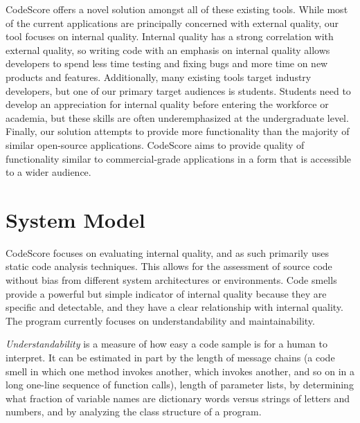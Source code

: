 \documentclass{sig-alternate}
\begin{document}
CodeScore offers a novel solution amongst all of these existing tools.
While most of the current applications are principally concerned with external
quality, our tool focuses on internal quality. Internal quality has a strong
correlation with external
quality, so writing code with an emphasis on internal quality allows developers
to spend less time testing and fixing bugs and
more time on new products and features. Additionally, many existing tools
target industry developers, but one of our primary target audiences is
students. Students need to develop an appreciation for internal quality
before entering the workforce or academia, but these skills are often
underemphasized at the undergraduate level. Finally, our solution attempts to
provide more functionality than the majority of similar open-source
applications. CodeScore aims to provide quality of functionality similar to
commercial-grade applications in a form that is accessible to a wider
audience.

\section{System Model}
\label{sec:system_model}


CodeScore focuses on evaluating internal quality, and as such primarily uses static code
analysis techniques. This allows for the assessment of source code without bias from different
system architectures or environments. Code smells provide a powerful but simple
indicator of internal quality because they are specific and detectable, and they
have a clear relationship with internal quality. The
program currently focuses on understandability and maintainability. 

\emph{Understandability} is a measure of how easy a code sample is for a human to
interpret. It can be estimated in part by the length of message chains (a code
smell in which one method invokes another, which invokes another, and so on in a
long one-line sequence of function calls), length of parameter lists, by
determining what fraction of variable names are dictionary words versus strings
of letters and numbers, and by analyzing the class structure of a program. 
\end{document}
